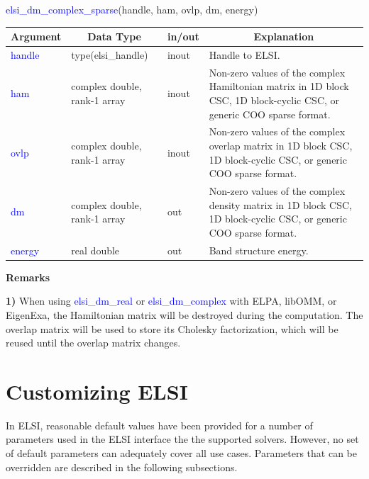 \documentclass{report}
\begin{document}
\begin{labeling}{\hspace{6cm}}
\item [\hspace{0.3cm} \textcolor{blue}{elsi\_dm\_complex\_sparse}(handle, ham, ovlp, dm, energy)]
\end{labeling}

\begin{tabular}[]{|p{20mm}|p{45mm}|p{15mm}|p{85mm}|}
\hline
\multicolumn{1}{|c|}{\textbf{Argument}} & \multicolumn{1}{c|}{\textbf{Data Type}} & \multicolumn{1}{c|}{\textbf{in/out}} & \multicolumn{1}{c|}{\textbf{Explanation}}\\
\hline
\textcolor{blue}{handle} & type(elsi\_handle)           & inout & Handle to ELSI.\\
\hline
\textcolor{blue}{ham}    & complex double, rank-1 array & inout & Non-zero values of the complex Hamiltonian matrix in 1D block CSC, 1D block-cyclic CSC, or generic COO sparse format.\\
\hline
\textcolor{blue}{ovlp}   & complex double, rank-1 array & inout & Non-zero values of the complex overlap matrix in 1D block CSC, 1D block-cyclic CSC, or generic COO sparse format.\\
\hline
\textcolor{blue}{dm}     & complex double, rank-1 array & out   & Non-zero values of the complex density matrix in 1D block CSC, 1D block-cyclic CSC, or generic COO sparse format.\\
\hline
\textcolor{blue}{energy} & real double                  & out   & Band structure energy.\\
\hline
\end{tabular}

\textbf{Remarks}

\textbf{1)} When using \textcolor{blue}{elsi\_dm\_real} or \textcolor{blue}{elsi\_dm\_complex} with ELPA, libOMM, or EigenExa, the Hamiltonian matrix will be destroyed during the computation. The overlap matrix will be used to store its Cholesky factorization, which will be reused until the overlap matrix changes.

\section{Customizing ELSI}
\label{sec:setter}
In ELSI, reasonable default values have been provided for a number of parameters used in the ELSI interface the the supported solvers. However, no set of default parameters can adequately cover all use cases. Parameters that can be overridden are described in the following subsections.
\end{document}
